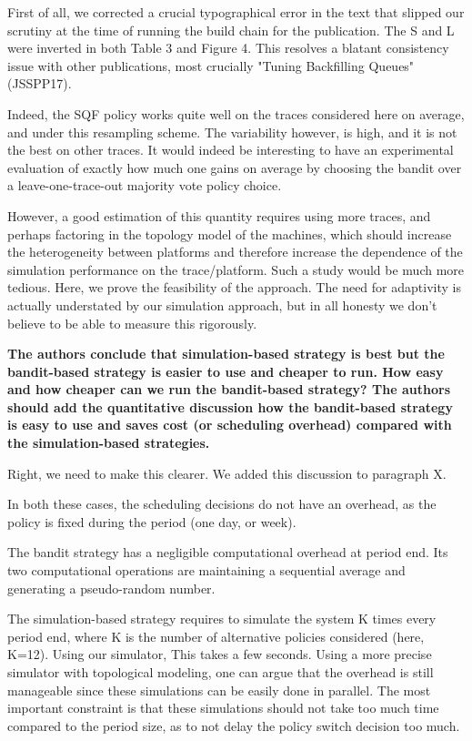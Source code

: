 \documentclass[]{article}
\begin{document}
First of all, we corrected a crucial typographical error in the text that slipped
our scrutiny at the time of running the build chain for the publication. The S and
L were inverted in both Table 3 and Figure 4. This resolves a blatant
consistency issue with other publications, most crucially "Tuning Backfilling
Queues"(JSSPP17).

Indeed, the SQF policy works quite well on the traces considered here on
average, and under this resampling scheme. The variability however, is high,
and it is not the best on other traces.  It would indeed be interesting to have
an experimental evaluation of exactly how much one gains on average by choosing
the bandit over a leave-one-trace-out majority vote policy choice.

However, a good estimation of this quantity requires using more traces, and
perhaps factoring in the topology model of the machines, which should increase
the heterogeneity between platforms and therefore increase the dependence of
the simulation performance on the trace/platform. Such a study would be much
more tedious. Here, we prove the feasibility of the approach. The need for
adaptivity is actually understated by our simulation approach, but in all
honesty we don't believe to be able to measure this rigorously.

\textbf{The authors conclude that simulation-based strategy is best but the bandit-based strategy is easier to use and cheaper
to run. How easy and how cheaper can we run the bandit-based strategy? The authors should add the quantitative
discussion how the bandit-based strategy is easy to use and saves cost (or scheduling overhead) compared with the
simulation-based strategies.
}

Right, we need to make this clearer. We added this discussion to paragraph X.

In both these cases, the scheduling decisions do not have an overhead, as the
policy is fixed during the period (one day, or week).

The bandit strategy has a negligible computational overhead at period end. Its two
computational operations are maintaining a sequential average and generating a
pseudo-random number.

The simulation-based strategy requires to simulate the system K times every
period end, where K is the number of alternative policies considered (here,
K=12). Using our simulator, This takes a few seconds. Using a more precise
simulator with topological modeling, one can argue that the overhead is still
manageable since these simulations can be easily done in parallel. The most
important constraint is that these simulations should not take too much time
compared to the period size, as to not delay the policy switch decision too
much.



\end{document}
